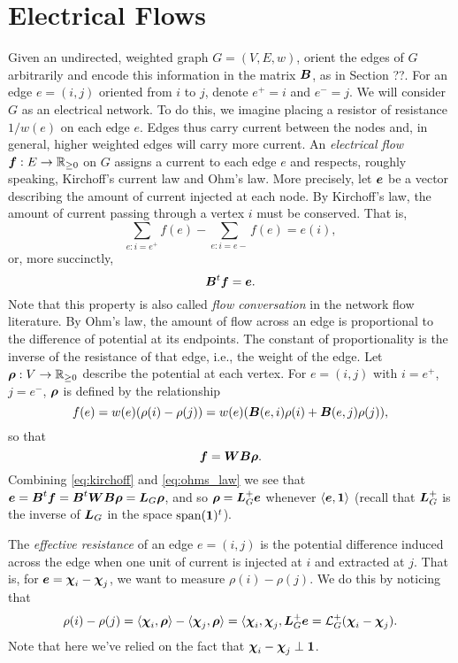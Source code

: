 \section{Electrical Flows}
Given an undirected, weighted graph $G=(V,E,w)$, orient the edges of $G$ arbitrarily and encode this information in the matrix $\vb*{B}$, as in Section ??. For an edge $e=(i,j)$ oriented from $i$ to $j$, denote $e^+=i$ and $e^-=j$. 
We will consider $G$ as an electrical network. To do this, we imagine placing a resistor of resistance $1/w(e)$ on each edge $e$. Edges thus carry current between the nodes and, in general, higher weighted edges will carry more current.  
An \emph{electrical flow $\vb*{f}:E\to\mathbb{R}_{\geq 0}$} on $G$ assigns a current to each edge $e$ and respects, roughly speaking, Kirchoff's current law and Ohm's law. More precisely, let $\vb*{e}$ be a vector describing the amount of current injected at each node. By Kirchoff's law, the amount of current passing through a vertex $i$ must be conserved. That is, 
\[\sum_{e:i=e^+}f(e) - \sum_{e:i=e-}f(e) = e(i),\]
or, more succinctly, 
\begin{equation}
\label{eq:kirchoff}
\vb*{B}^t \vb*{f}=\vb*{e}. 
\end{equation}
Note that this property is also called \emph{flow conversation} in the network flow literature. 
By Ohm's law, the amount of flow across an edge is proportional to the difference of potential at its endpoints. The constant of proportionality is the inverse of the resistance of that edge, i.e., the weight of the edge. Let $\vb*{\rho}:V\to\mathbb{R}_{\geq 0}$ describe the potential at each vertex. For $e=(i,j)$ with $i=e^+$, $j=e^-$, $\vb*{\rho}$ is defined by the relationship 
\begin{equation*}
f(e) = w(e)(\rho(i)-\rho(j)) = w(e) (\vb*{B}(e,i)\rho(i) + \vb*{B}(e,j)\rho(j)),
\end{equation*}
so that
\begin{equation}
\label{eq:ohms_law}
\vb*{f}=\vb*{W}\vb*{B}\vb*{\rho}.
\end{equation}
Combining \eqref{eq:kirchoff} and \eqref{eq:ohms_law} we see that $\vb*{e}=\vb*{B}^t \vb*{f}=\vb*{B}^t \vb*{W}\vb*{B} \vb*{\rho} = \vb*{L}_G\vb*{\rho}$, and so $\vb*{\rho} = \vb*{L}_G^+\vb*{e}$ whenever $\langle \vb*{e},\vb{1}\rangle$ (recall that $\vb*{L}_G^+$ is the inverse of $\vb*{L}_G$ in the space $\textnormal{span}(\vb{1})^t$).  

The \emph{effective resistance} of an edge $e=(i,j)$ is the potential difference induced across the edge when one unit of current is injected at $i$ and extracted at $j$. That is, for $\vb*{e}=\boldsymbol{\chi}_i-\boldsymbol{\chi}_j$, we want to measure $\rho(i)-\rho(j)$. We do this by noticing that 
\[\rho(i)-\rho(j) = \langle \boldsymbol{\chi}_i,\vb*{\rho}\rangle - \langle \boldsymbol{\chi}_j,\vb*{\rho}\rangle = \langle \boldsymbol{\chi}_i,\boldsymbol{\chi}_j,\vb*{L}_G^+\vb*{e}=\mathcal{L}_G^+(\boldsymbol{\chi}_i-\boldsymbol{\chi}_j).\]
Note that here we've relied on the fact that $\boldsymbol{\chi}_i-\boldsymbol{\chi}_j\perp \vb{1}$. 


